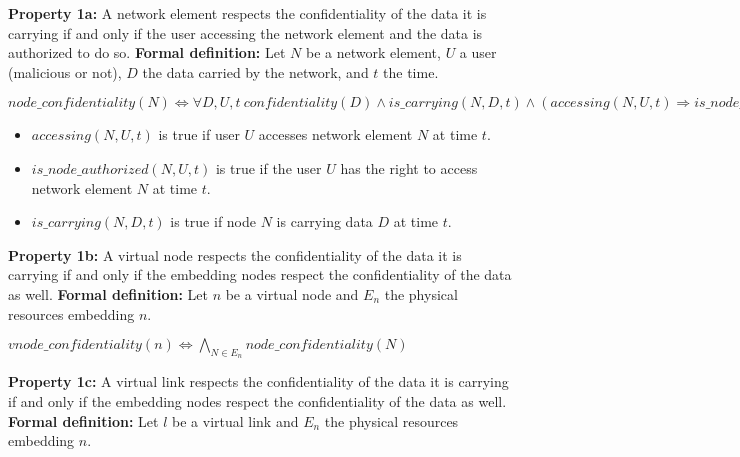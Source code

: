 
\textbf{Property 1a:} A network element respects the confidentiality of the data it is carrying if and only if the user accessing the network element and the data is authorized to do so.
\newline \textbf{Formal definition:} Let $N$ be a network element, $U$ a user (malicious or not), $D$ the data carried by the network, and $t$ the time.


\begin{myformula}
$node\_confidentiality(N) \Leftrightarrow \forall D,U,t~
confidentiality(D) \wedge is\_carrying(N,D,t) \wedge (accessing(N,U,t) \Rightarrow is\_node\_authorized(N,U,t))$
\end{myformula}

\begin{itemize}
\item $accessing(N,U,t)$ is true if user $U$ accesses network element $N$ at time $t$.
\item $is\_node\_authorized(N,U,t)$ is true if the user $U$ has the right to access network element $N$ at time $t$.
\item $is\_carrying(N,D,t)$ is true if node $N$ is carrying data $D$ at time $t$.
\end{itemize}

\textbf{Property 1b:} A virtual node respects the confidentiality of the data it is carrying if and only if the embedding nodes respect the confidentiality of the data as well.
\newline \textbf{Formal definition:} Let $n$ be a virtual node and $E_n$ the physical resources embedding $n$.


\begin{myformula}
$vnode\_confidentiality(n) \Leftrightarrow \bigwedge\limits_{N\in E_n} node\_confidentiality(N) $
\end{myformula}

\textbf{Property 1c:} A virtual link respects the confidentiality of the data it is carrying if and only if the embedding nodes respect the confidentiality of the data as well.
\newline \textbf{Formal definition:} Let $l$ be a virtual link and $E_n$ the physical resources embedding $n$.


